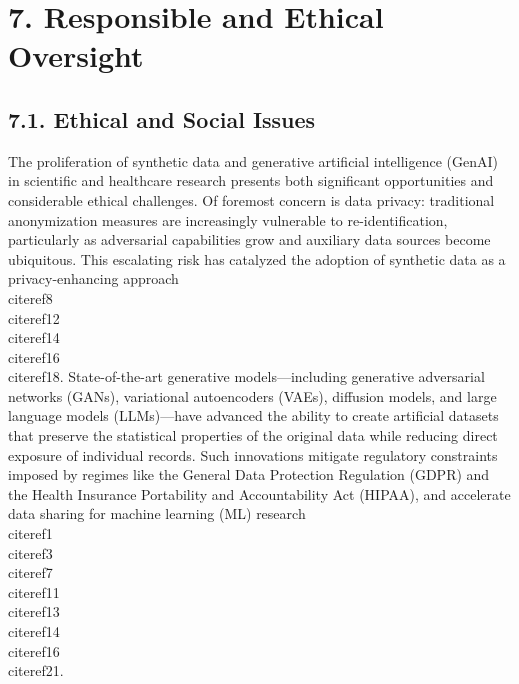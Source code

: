 \documentclass[11pt]{article}
\begin{document}
\section{7. Responsible and Ethical Oversight}

\subsection{7.1. Ethical and Social Issues}

The proliferation of synthetic data and generative artificial intelligence (GenAI) in scientific and healthcare research presents both significant opportunities and considerable ethical challenges. Of foremost concern is data privacy: traditional anonymization measures are increasingly vulnerable to re-identification, particularly as adversarial capabilities grow and auxiliary data sources become ubiquitous. This escalating risk has catalyzed the adoption of synthetic data as a privacy-enhancing approach \\cite{ref8}\\cite{ref12}\\cite{ref14}\\cite{ref16}\\cite{ref18}. State-of-the-art generative models—including generative adversarial networks (GANs), variational autoencoders (VAEs), diffusion models, and large language models (LLMs)—have advanced the ability to create artificial datasets that preserve the statistical properties of the original data while reducing direct exposure of individual records. Such innovations mitigate regulatory constraints imposed by regimes like the General Data Protection Regulation (GDPR) and the Health Insurance Portability and Accountability Act (HIPAA), and accelerate data sharing for machine learning (ML) research \\cite{ref1}\\cite{ref3}\\cite{ref7}\\cite{ref11}\\cite{ref13}\\cite{ref14}\\cite{ref16}\\cite{ref21}.
\end{document}
